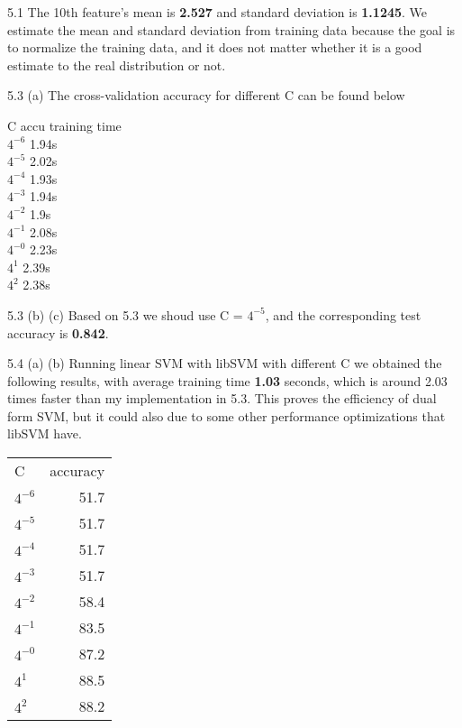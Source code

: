 \documentclass[12pt]{article}
\newenvironment{problem}[2][Problem]{\begin{trivlist}
\item[\hskip \labelsep {\bfseries #1}\hskip \labelsep {\bfseries #2}]}{\end{trivlist}}
\begin{document}
\begin{problem}{5. Programming}
\item{5.1}
The 10th feature's mean is \textbf{2.527} and standard deviation is \textbf{1.1245}. We estimate the mean and standard deviation from training data because the goal is to normalize the training data, and it does not matter whether it is a good estimate to the real distribution or not.
\item{5.3 (a)}
The cross-validation accuracy for different C can be found below
\begin{center}
	C     \:\: accu \:\: training time\\
	$4^{-6}$  \: 1.94s\\
	$4^{-5}$  \: 2.02s\\
	$4^{-4}$  \: 1.93s\\
	$4^{-3}$  \: 1.94s\\
	$4^{-2}$  \: 1.9s\\
	$4^{-1}$  \: 2.08s\\
	$4^{-0}$  \: 2.23s\\
	$4^1$ \:\: \: 2.39s\\
	$4^2$ \:\: \: 2.38s\\
\end{center}
\item{5.3 (b) (c)}
Based on 5.3 we shoud use C = $4^{-5}$, and the corresponding test accuracy is \textbf{0.842}.
\item{5.4 (a) (b)}
Running linear SVM with libSVM with different C we obtained the following results, with average training time \textbf{1.03} seconds, which is around 2.03 times faster than my implementation in 5.3. This proves the efficiency of dual form SVM, but it could also due to some other performance optimizations that libSVM have. 
\begin{center}
\begin{tabular}{ l | r}
    C &  accuracy\\
    $4^{-6}$  & 51.7\\
    $4^{-5}$  & 51.7\\
    $4^{-4}$  & 51.7\\
    $4^{-3}$  & 51.7\\
    $4^{-2}$  & 58.4\\
    $4^{-1}$  & 83.5\\
    $4^{-0}$  & 87.2\\
    $4^{1}$  & 88.5\\
    $4^{2}$  & 88.2\\
\end{tabular}
\end{center}


\end{problem}
\end{document}
